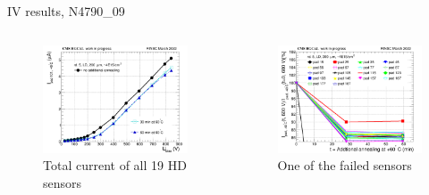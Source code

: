 \documentclass{beamer}
\begin{document}
\begin{frame}{IV results, N4790\_09}
  \begin{columns}
       \begin{figure}
           \includegraphics[width=1.0\textwidth]{plots/annealing_IV_ch101_N4790_09.png}
           \caption{Total current of all 19 HD sensors}
       \end{figure}

       \begin{figure}
           \includegraphics[width=1.0\textwidth]{plots/annealing_current_N4790_09.png}
           \caption{One of the failed sensors}
       \end{figure}
   \end{columns}
\end{frame}
\end{document}
